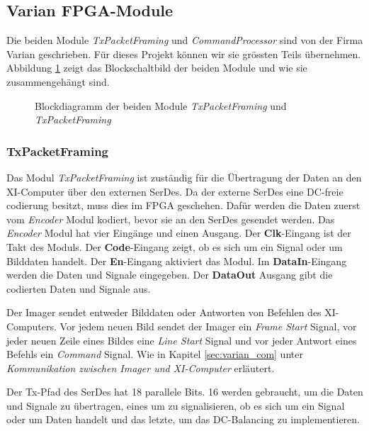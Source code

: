 \documentclass{article}
\begin{document}
\subsection{Varian FPGA-Module}
Die beiden Module \textit{TxPacketFraming} und \textit{CommandProcessor} sind von der Firma Varian geschrieben. Für dieses Projekt können wir sie grössten Teils übernehmen. Abbildung \ref{fig:bd_fpga_varian} zeigt das Blockschaltbild der beiden Module und wie sie zusammengehängt sind.

\begin{figure}[tb]
    \caption{Blockdiagramm der beiden Module \textit{TxPacketFraming} und \textit{TxPacketFraming}}
    \label{fig:bd_fpga_varian}
\end{figure}

\subsubsection*{TxPacketFraming}
Das Modul \textit{TxPacketFraming} ist zuständig für die Übertragung der Daten an den XI-Computer über den externen SerDes. Da der externe SerDes eine DC-freie codierung besitzt, muss dies im FPGA geschehen. Dafür werden die Daten zuerst vom \textit{Encoder} Modul kodiert, bevor sie an den SerDes gesendet werden. Das \textit{Encoder} Modul hat vier Eingänge und einen Ausgang.
Der \textbf{Clk}-Eingang ist der Takt des Moduls.
Der \textbf{Code}-Eingang zeigt, ob es sich um ein Signal oder um Bilddaten handelt.
Der \textbf{En}-Eingang aktiviert das Modul.
Im \textbf{DataIn}-Eingang werden die Daten und Signale eingegeben.
Der \textbf{DataOut} Ausgang gibt die codierten Daten und Signale aus.

Der Imager sendet entweder Bilddaten oder Antworten von Befehlen des XI-Computers. Vor jedem neuen Bild sendet der Imager ein \textit{Frame Start} Signal, vor jeder neuen Zeile eines Bildes eine \textit{Line Start} Signal und vor jeder Antwort eines Befehls ein \textit{Command} Signal. Wie in Kapitel \ref{sec:varian_com} unter \textit{Kommunikation zwischen Imager und XI-Computer} erläutert.

Der Tx-Pfad des SerDes hat 18 parallele Bits. 16 werden gebraucht, um die Daten und Signale zu übertragen, eines um zu signalisieren, ob es sich um ein Signal oder um Daten handelt und das letzte, um das DC-Balancing zu implementieren.
\end{document}
